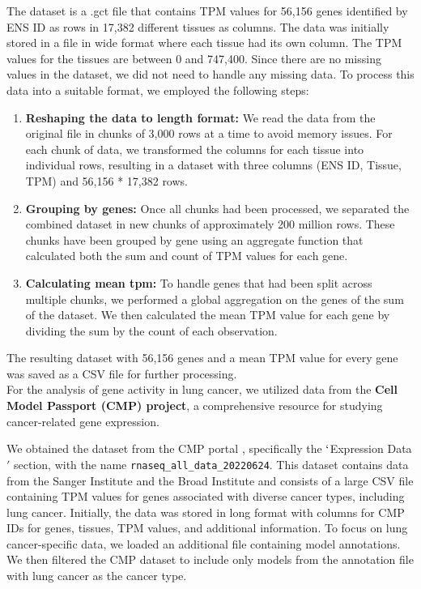 The dataset is a .gct file that contains TPM values for 56,156 genes identified by ENS ID as rows in 17,382 different tissues as columns.
The data was initially stored in a file in wide format where each tissue had its own column.
The TPM values for the tissues are between 0 and 747,400.
Since there are no missing values in the dataset, we did not need to handle any missing data.
To process this data into a suitable format, we employed the following steps:
\begin{enumerate}
    \item \textbf{Reshaping the data to length format:} We read the data from the original file in chunks of 3,000 rows at a time to avoid memory issues.
    For each chunk of data, we transformed the columns for each tissue into individual rows,
    resulting in a dataset with three columns (ENS ID, Tissue, TPM) and 56,156 * 17,382 rows.
    \item \textbf{Grouping by genes:} Once all chunks had been processed, we separated the combined dataset in new chunks of approximately 200 million rows.
    These chunks have been grouped by gene using an aggregate function that calculated both the sum and count of TPM values for each gene.
    \item \textbf{Calculating mean tpm:} To handle genes that had been split across multiple chunks,
    we performed a global aggregation on the genes of the sum of the dataset.
    We then calculated the mean TPM value for each gene by dividing the sum by the count of each observation.
\end{enumerate}
The resulting dataset with 56,156 genes and a mean TPM value for every gene was saved as a CSV file for further processing.
\\




For the analysis of gene activity in lung cancer, we utilized data from the \textbf{Cell Model Passport (CMP) project},
a comprehensive resource for studying cancer-related gene expression.

We obtained the dataset from the CMP portal \cite{cmp_download}, specifically the $`$Expression Data$'$ section,
with the name \texttt{rnaseq\_all\_data\_20220624}.
This dataset contains data from the Sanger Institute and the Broad Institute and
consists of a large CSV file containing TPM values for genes associated with diverse cancer types, including lung cancer.
Initially, the data was stored in long format with columns for CMP IDs for genes, tissues, TPM values, and additional information.
To focus on lung cancer-specific data, we loaded an additional file containing model annotations. \cite{cmp_download}
We then filtered the CMP dataset to include only models from the annotation file with lung cancer as the cancer type.

